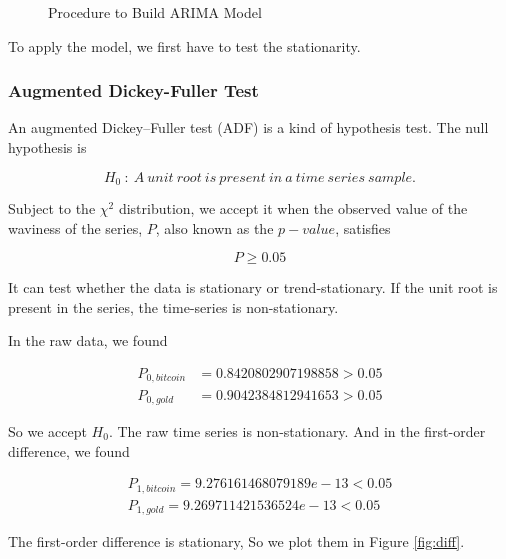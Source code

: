 \documentclass[12pt,a4paper]{article}
\begin{document}
\begin{spacing}{1.2}
 \begin{figure}[H]
 	\caption{Procedure to Build ARIMA Model}
 	\label{figure:flow_chart}
 \end{figure}


To apply the model, we first have to test the stationarity.

\subsubsection{Augmented Dickey-Fuller Test}

An augmented Dickey–Fuller test (ADF) is a kind of hypothesis test. The null hypothesis is 

$$
H_0 \ : \ A \ unit \ root \ is \ present \ in \ a \ time \ series \ sample.
$$

Subject to the $\chi^2$ distribution, we accept it when the observed value of the waviness of the series, $P$, also known as the $p-value$, satisfies

$$
P \ge 0.05
$$

It can test whether the data is stationary or trend-stationary. If the unit root is present in the series, the time-series is non-stationary.

In the raw data, we found

\begin{align*}
	P_{0,bitcoin} &=0.8420802907198858 > 0.05 \\
	P_{0,gold} &=0.9042384812941653 > 0.05 
\end{align*}


So we accept $H_0$. The raw time series is non-stationary.
And in the first-order difference, we found


\begin{align*}
	P_{1,bitcoin}=9.276161468079189e-13 < 0.05 \\
	P_{1,gold}=9.269711421536524e-13 < 0.05
\end{align*}

The first-order difference is stationary, So we plot them in Figure \ref{fig:diff}. 


\end{spacing}
\end{document}
